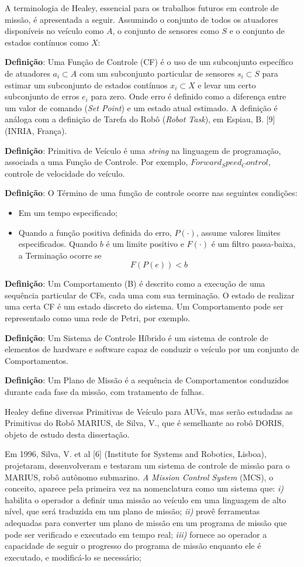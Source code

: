 A terminologia de Healey, essencial para os trabalhos futuros em controle de
missão, é apresentada a seguir. Assumindo o conjunto de todos os atuadores
disponíveis no veículo como $A$, o conjunto de sensores como $S$ e o conjunto de estados
contínuos como $X$:

\textbf{Definição}: Uma Função de Controle (CF) é o uso de um subconjunto
específico de atuadores $a_i \subset A$ com um subconjunto particular de
sensores $s_i \subset S$ para estimar um subconjunto de estados contínuos $x_i
\subset X$ e levar um certo subconjunto de erros $e_i$ para zero. Onde erro é
definido como a diferença entre um valor de comando (\emph{Set Point}) e um
estado atual estimado. A definição é análoga com a definição de Tarefa do Robô
(\emph{Robot Task}), em Espiau, B. [9] (INRIA, França).

\textbf{Definição}: Primitiva de Veículo é uma \emph{string} na linguagem de
programação, associada a uma Função de Controle. Por exemplo,
$Forward_Speed_Control$, controle de velocidade do veículo.

\textbf{Definição}: O Término de uma função de controle ocorre nas seguintes
condições:
\begin{itemize}
  \item Em um tempo especificado;
  \item Quando a função positiva definida do erro, $P(\cdot)$, assume valores
  limites especificados. Quando $b$ é um limite positivo e $F(\cdot)$ é um
  filtro passa-baixa, a Terminação ocorre se
  $$F(P(e)) < b$$
\end{itemize}  
\textbf{Definição}: Um Comportamento (B) é descrito como a execução de uma
sequência particular de CFs, cada uma com sua terminação. O estado de realizar
uma certa CF é um estado discreto do sistema. Um Comportamento pode ser
representado como uma rede de Petri, por exemplo.

\textbf{Definição}: Um Sistema de Controle Híbrido é um sistema de controle de
elementos de hardware e software capaz de conduzir o veículo por um conjunto de
Comportamentos.

\textbf{Definição}: Um Plano de Missão é a sequência de Comportamentos
conduzidos durante cada fase da missão, com tratamento de falhas.

Healey define diversas Primitivas de Veículo para AUVs, mas serão estudadas as
Primitivas do Robô MARIUS, de Silva, V., que é semelhante ao robô DORIS,
objeto de estudo desta dissertação.

Em 1996, Silva, V. et al [6] (Institute for Systems and Robotics, Lisboa),
projetaram, desenvolveram e testaram um sistema de controle de missão para o
MARIUS, robô autônomo submarino. \emph{A Mission Control System} (MCS), o
conceito, aparece pela primeira vez na nomenclatura como um sistema que:
\emph{i)} habilita o operador a definir uma missão ao veículo em uma linguagem
de alto nível, que será traduzida em um plano de missão; \emph{ii)} provê
ferramentas adequadas para converter um plano de missão em um programa de
missão que pode ser verificado e executado em tempo real; \emph{iii)} fornece
ao operador a capacidade de seguir o progresso do programa de missão enquanto
ele é executado, e modificá-lo se necessário;


